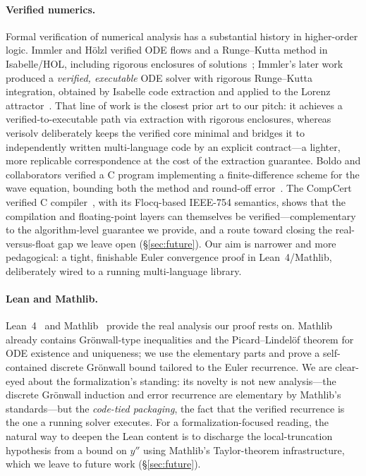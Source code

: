 \documentclass[sigplan,nonacm,screen,review]{acmart}
\begin{document}
\paragraph{Verified numerics.}
Formal verification of numerical analysis has a substantial history in
higher-order logic. Immler and Hölzl verified ODE flows and a Runge--Kutta
method in Isabelle/HOL, including rigorous enclosures of
solutions~\cite{immler2012}; Immler's later work produced a \emph{verified,
executable} ODE solver with rigorous Runge--Kutta integration, obtained by
Isabelle code extraction and applied to the Lorenz attractor~\cite{immler2018}.
That line of work is the closest prior art to our pitch: it achieves a
verified-to-executable path via extraction with rigorous enclosures, whereas
verisolv deliberately keeps the verified core minimal and bridges it to
independently written multi-language code by an explicit contract---a lighter,
more replicable correspondence at the cost of the extraction guarantee.
Boldo and collaborators verified a C program implementing a finite-difference
scheme for the wave equation, bounding both the method and round-off
error~\cite{boldo2013wave}. The CompCert verified C compiler~\cite{leroy2009},
with its Flocq-based IEEE-754 semantics, shows that the compilation and
floating-point layers can themselves be verified---complementary to the
algorithm-level guarantee we provide, and a route toward closing the
real-versus-float gap we leave open (\S\ref{sec:future}). Our aim is
narrower and more pedagogical: a tight, finishable Euler convergence proof in
Lean~4/Mathlib, deliberately wired to a running multi-language library.

\paragraph{Lean and Mathlib.}
Lean~4~\cite{demoura2021lean4} and Mathlib~\cite{mathlib2020} provide the real
analysis our proof rests on. Mathlib already contains Grönwall-type inequalities
and the Picard--Lindelöf theorem for ODE existence and uniqueness; we use the
elementary parts and prove a self-contained discrete Grönwall bound tailored to
the Euler recurrence. We are clear-eyed about the formalization's standing: its
novelty is not new analysis---the discrete Grönwall induction and error
recurrence are elementary by Mathlib's standards---but the \emph{code-tied
packaging}, the fact that the verified recurrence is the one a running solver
executes. For a formalization-focused reading, the natural way to deepen the Lean
content is to discharge the local-truncation hypothesis from a bound on $y''$
using Mathlib's Taylor-theorem infrastructure, which we leave to future work
(\S\ref{sec:future}).
\end{document}
